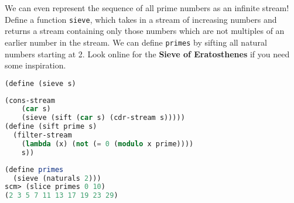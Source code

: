 \question We can even represent the sequence of all prime numbers as an
infinite stream! Define a function \texttt{sieve}, which takes in a stream of
increasing numbers and returns a stream containing only those numbers which are
not multiples of an earlier number in the stream. We can define
\texttt{primes} by sifting all natural numbers starting at 2. Look online for
the \textbf{Sieve of Eratosthenes} if you need some inspiration. \newline

\begin{lstlisting}[language=Scheme]
(define (sieve s)
\end{lstlisting}
\begin{solution}[4cm]
\begin{lstlisting}[language=Scheme]
  (cons-stream
    (car s)
    (sieve (sift (car s) (cdr-stream s)))))
(define (sift prime s)
  (filter-stream
    (lambda (x) (not (= 0 (modulo x prime))))
    s))
\end{lstlisting}
\end{solution}
\begin{lstlisting}[language=Scheme]
(define primes
  (sieve (naturals 2)))
scm> (slice primes 0 10)
(2 3 5 7 11 13 17 19 23 29)
\end{lstlisting}
